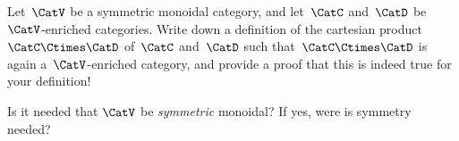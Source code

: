 
\begin{gradedexercise}
	\label{ex:ProductOfEnrichedCats}
	Let~$\CatV$ be a symmetric monoidal category, and let~$\CatC$ and~$\CatD$ be~$\CatV$-enriched categories.
	Write down a definition of the cartesian product~$\CatC \Ctimes \CatD$ of~$\CatC$ and~$\CatD$ such that~$\CatC \Ctimes \CatD$ is again a~$\CatV$-enriched category, and provide a proof that this is indeed true for your definition!

	Is it needed that $\CatV$ be \emph{symmetric} monoidal?
	If yes, were is symmetry needed?
\end{gradedexercise}

